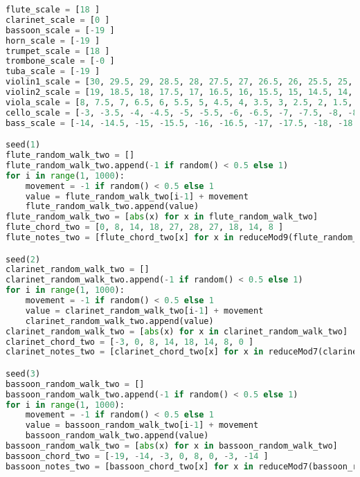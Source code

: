 \begin{lstlisting}[language=Python, caption=Tianshu Segment\_II]
flute_scale = [18 ]
clarinet_scale = [0 ]
bassoon_scale = [-19 ]
horn_scale = [-19 ]
trumpet_scale = [18 ]
trombone_scale = [-0 ]
tuba_scale = [-19 ]
violin1_scale = [30, 29.5, 29, 28.5, 28, 27.5, 27, 26.5, 26, 25.5, 25, 24.5, 24, 23.5, 23, 22.5, 22, 21.5, 21, 20.5, 20, 19.5, 19, 19.5, 20, 20.5, 21, 21.5, 22, 22.5, 23, 23.5, 24, 24.5, 25, 25.5, 26, 26.5, 27, 27.5, 28, 28.5, 29, 29.5, ]
violin2_scale = [19, 18.5, 18, 17.5, 17, 16.5, 16, 15.5, 15, 14.5, 14, 13.5, 13, 12.5, 12, 11.5, 11, 10.5, 10, 9.5, 9, 8.5, 8, 8.5, 9, 9.5, 10, 10.5, 11, 11.5, 12, 12.5, 13, 13.5, 14, 14.5, 15, 15.5, 16, 16.5, 17, 17.5, 18, 18.5, ]
viola_scale = [8, 7.5, 7, 6.5, 6, 5.5, 5, 4.5, 4, 3.5, 3, 2.5, 2, 1.5, 1, 0.5, 0, -0.5, -1, -1.5, -2, -2.5, -3, -2.5, -2, -1.5, -1, -0.5, 0, 0.5, 1, 1.5, 2, 2.5, 3, 3.5, 4, 4.5, 5, 5.5, 6, 6.5, 7, 7.5, ]
cello_scale = [-3, -3.5, -4, -4.5, -5, -5.5, -6, -6.5, -7, -7.5, -8, -8.5, -9, -9.5, -10, -10.5, -11, -11.5, -12, -12.5, -13, -13.5, -14, -13.5, -13, -12.5, -12, -11.5, -11, -10.5, -10, -9.5, -9, -8.5, -8, -7.5, -7, -6.5, -6, -5.5, -5, -4.5, -4, -3.5, ]
bass_scale = [-14, -14.5, -15, -15.5, -16, -16.5, -17, -17.5, -18, -18.5, -19, -19.5, -20, -20.5, -21, -21.5, -22, -22.5, -23, -23.5, -24, -24.5, -25, -24.5, -24, -23.5, -23, -22.5, -22, -21.5, -21, -20.5, -20, -19.5, -19, -18.5, -18, -17.5, -17, -16.5, -16, -15.5, -15, -14.5, ]

seed(1)
flute_random_walk_two = []
flute_random_walk_two.append(-1 if random() < 0.5 else 1)
for i in range(1, 1000):
    movement = -1 if random() < 0.5 else 1
    value = flute_random_walk_two[i-1] + movement
    flute_random_walk_two.append(value)
flute_random_walk_two = [abs(x) for x in flute_random_walk_two]
flute_chord_two = [0, 8, 14, 18, 27, 28, 27, 18, 14, 8 ]
flute_notes_two = [flute_chord_two[x] for x in reduceMod9(flute_random_walk_two)]

seed(2)
clarinet_random_walk_two = []
clarinet_random_walk_two.append(-1 if random() < 0.5 else 1)
for i in range(1, 1000):
    movement = -1 if random() < 0.5 else 1
    value = clarinet_random_walk_two[i-1] + movement
    clarinet_random_walk_two.append(value)
clarinet_random_walk_two = [abs(x) for x in clarinet_random_walk_two]
clarinet_chord_two = [-3, 0, 8, 14, 18, 14, 8, 0 ]
clarinet_notes_two = [clarinet_chord_two[x] for x in reduceMod7(clarinet_random_walk_two)]

seed(3)
bassoon_random_walk_two = []
bassoon_random_walk_two.append(-1 if random() < 0.5 else 1)
for i in range(1, 1000):
    movement = -1 if random() < 0.5 else 1
    value = bassoon_random_walk_two[i-1] + movement
    bassoon_random_walk_two.append(value)
bassoon_random_walk_two = [abs(x) for x in bassoon_random_walk_two]
bassoon_chord_two = [-19, -14, -3, 0, 8, 0, -3, -14 ]
bassoon_notes_two = [bassoon_chord_two[x] for x in reduceMod7(bassoon_random_walk_two)]


\end{lstlisting}
